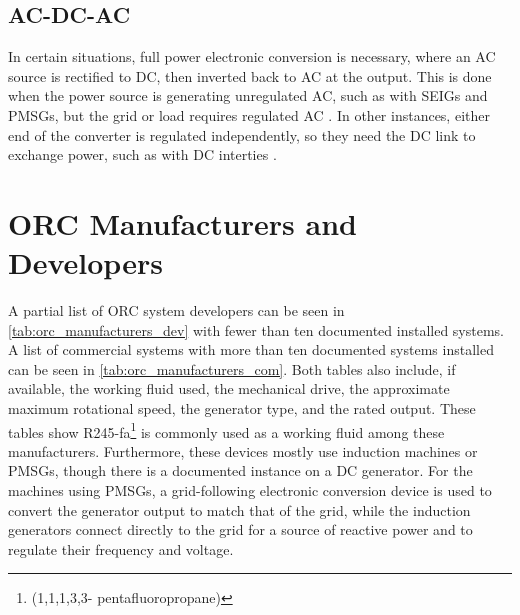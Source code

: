 \subsection{AC-DC-AC}
In certain situations, full power electronic conversion is necessary, where an AC source is rectified to DC, then inverted back to AC at the output. This is done when the power source is generating unregulated AC, such as with SEIGs and PMSGs, but the grid or load requires regulated AC \cite{ALOLAH1994111, Seung-HoSong2003}. In other instances, either end of the converter is regulated independently, so they need the DC link to exchange power, such as with DC interties \cite{Okada}.

\section{ORC Manufacturers and Developers}
A partial list of ORC system developers can be seen in \autoref{tab:orc_manufacturers_dev} with fewer than ten documented installed systems. A list of commercial systems with more than ten documented systems installed can be seen in \autoref{tab:orc_manufacturers_com}. Both tables also include, if available, the working fluid used, the mechanical drive, the approximate maximum rotational speed, the generator type, and the rated output. These tables show R245-fa\footnote{ (1,1,1,3,3- pentafluoropropane)} is commonly used as a working fluid among these manufacturers. Furthermore, these devices mostly use induction machines or PMSGs, though there is a documented instance on a DC generator. For the machines using PMSGs, a grid-following electronic conversion device is used to convert the generator output to match that of the grid, while the induction generators connect directly to the grid for a source of reactive power and to regulate their frequency and voltage.
 

\cleardoublepage